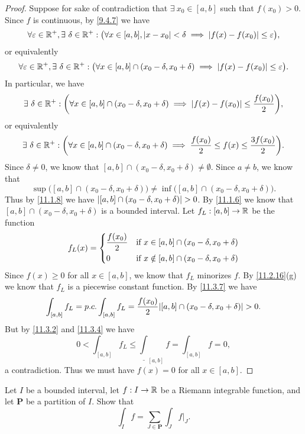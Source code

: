 \begin{proof}
  Suppose for sake of contradiction that \(\exists\ x_0 \in [a, b]\) such that \(f(x_0) > 0\).
  Since \(f\) is continuous, by \cref{9.4.7} we have
  \[
    \forall \varepsilon \in \mathbb{R}^+, \exists\ \delta \in \mathbb{R}^+ : \big(\forall x \in [a, b], \left\lvert x - x_0\right\rvert < \delta \implies \left\lvert f(x) - f(x_0)\right\rvert \leq \varepsilon\big),
  \]
  or equivalently
  \[
    \forall \varepsilon \in \R^+, \exists\ \delta \in \R^+ : \big(\forall x \in [a, b] \cap (x_0 - \delta, x_0 + \delta) \implies \abs{f(x) - f(x_0)} \leq \varepsilon\big).
  \]
  In particular, we have
  \[
    \exists\ \delta \in \mathbb{R}^+ : \bigg(\forall x \in [a, b] \cap (x_0 - \delta, x_0 + \delta) \implies \left\lvert f(x) - f(x_0)\right\rvert \leq \dfrac{f(x_0)}{2}\bigg),
  \]
  or equivalently
  \[
    \exists\ \delta \in \mathbb{R}^+ : \bigg(\forall x \in [a, b] \cap (x_0 - \delta, x_0 + \delta) \implies \dfrac{f(x_0)}{2} \leq f(x) \leq \dfrac{3 f(x_0)}{2}\bigg).
  \]
  Since \(\delta \neq 0\), we know that \([a, b] \cap (x_0 - \delta, x_0 + \delta) \neq \emptyset\).
  Since \(a \neq b\), we know that
  \[
    \sup\big([a, b] \cap (x_0 - \delta, x_0 + \delta)\big) \neq \inf\big([a, b] \cap (x_0 - \delta, x_0 + \delta)\big).
  \]
  Thus by \cref{11.1.8} we have \(\left\lvert[a, b] \cap (x_0 - \delta, x_0 + \delta)\right\rvert > 0\).
  By \cref{11.1.6} we know that \([a, b] \cap (x_0 - \delta, x_0 + \delta)\) is a bounded interval.
  Let \(f_L : [a, b] \to \mathbb{R}\) be the function
  \[
    f_L(x) = \begin{dcases}
      \dfrac{f(x_0)}{2} & \text{if } x \in [a, b] \cap (x_0 - \delta, x_0 + \delta)    \\
      0                 & \text{if } x \notin [a, b] \cap (x_0 - \delta, x_0 + \delta)
    \end{dcases}
  \]
  Since \(f(x) \geq 0\) for all \(x \in [a, b]\), we know that \(f_L\) minorizes \(f\).
  By \cref{11.2.16}(g) we know that \(f_L\) is a piecewise constant function.
  By \cref{11.3.7} we have
  \[
    \int_{[a, b]} f_L = p.c. \int_{[a, b]} f_L = \dfrac{f(x_0)}{2}\abs{[a, b] \cap (x_0 - \delta, x_0 + \delta)} > 0.
  \]
  But by \cref{11.3.2} and \cref{11.3.4} we have
  \[
    0 < \int_{[a, b]} f_L \leq \underline{\int}_{[a, b]} f = \int_{[a, b]} f = 0,
  \]
  a contradiction.
  Thus we must have \(f(x) = 0\) for all \(x \in [a, b]\).
\end{proof}

\begin{ex}\label{ex:11.4.3}
  Let \(I\) be a bounded interval, let \(f : I \to \mathbb{R}\) be a Riemann integrable function, and let \(\mathbf{P}\) be a partition of \(I\).
  Show that
  \[
    \int_I f = \sum_{J \in \mathbf{P}} \int_J f|_J.
  \]
\end{ex}

